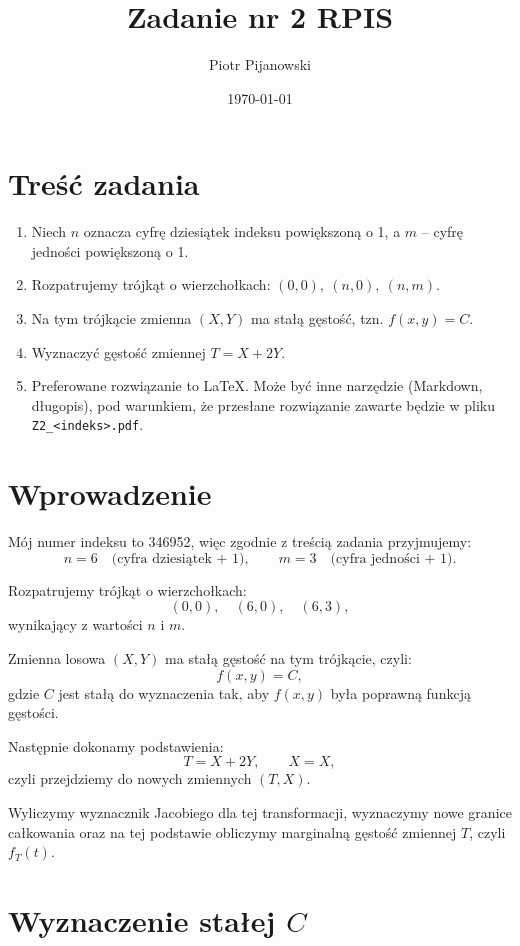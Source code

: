 \documentclass{article}
\title{Zadanie nr 2 RPIS}
\author{Piotr Pijanowski}
\date{\today}
\begin{document}
\maketitle

\section{Treść zadania}

\begin{enumerate}
  \item Niech \( n \) oznacza cyfrę dziesiątek indeksu powiększoną o 1, a \( m \) – cyfrę jedności powiększoną o 1.
  \item Rozpatrujemy trójkąt o wierzchołkach: \( (0, 0),\ (n, 0),\ (n, m) \).
  \item Na tym trójkącie zmienna \( (X, Y) \) ma stałą gęstość, tzn. \( f(x, y) = C \).
  \item Wyznaczyć gęstość zmiennej \( T = X + 2Y \).
  \item Preferowane rozwiązanie to \LaTeX{}. Może być inne narzędzie (Markdown, długopis), pod warunkiem, że przesłane rozwiązanie zawarte będzie w pliku \texttt{Z2\_<indeks>.pdf}.
\end{enumerate}

\section{Wprowadzenie}

Mój numer indeksu to 346952, więc zgodnie z treścią zadania przyjmujemy:
\[
n = 6 \quad \text{(cyfra dziesiątek + 1)}, \qquad m = 3 \quad \text{(cyfra jedności + 1)}.
\]

Rozpatrujemy trójkąt o wierzchołkach:
\[
(0, 0), \quad (6, 0), \quad (6, 3),
\]
wynikający z wartości \( n \) i \( m \).

Zmienna losowa \( (X, Y) \) ma stałą gęstość na tym trójkącie, czyli:
\[
f(x, y) = C,
\]
gdzie \( C \) jest stałą do wyznaczenia tak, aby \( f(x, y) \) była poprawną funkcją gęstości.

Następnie dokonamy podstawienia:
\[
T = X + 2Y, \qquad X = X,
\]
czyli przejdziemy do nowych zmiennych \( (T, X) \).

Wyliczymy wyznacznik Jacobiego dla tej transformacji, wyznaczymy nowe granice całkowania oraz na tej podstawie obliczymy marginalną gęstość zmiennej \( T \), czyli \( f_T(t) \).

\section{Wyznaczenie stałej \( C \)}
\end{document}
